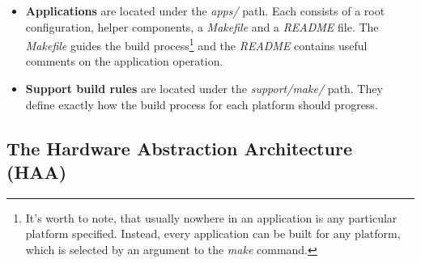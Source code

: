 \begin{itemize}
  \item {\bf Applications} are located under the \emph{apps/} path. Each consists of a root configuration, helper components, a \emph{Makefile} and a \emph{README} file. The \emph{Makefile} guides the build process\footnote{It's worth to note, that usually nowhere in an application is any particular platform specified. Instead, every application can be built for any platform, which is selected by an argument to the \emph{make} command.} and the \emph{README} contains useful comments on the application operation.

  \item {\bf Support build rules} are located under the \emph{support/make/} path. They define exactly how the build process for each platform should progress.

\end{itemize}

\subsection{The Hardware Abstraction Architecture (HAA)}
\label{haa_arch}

